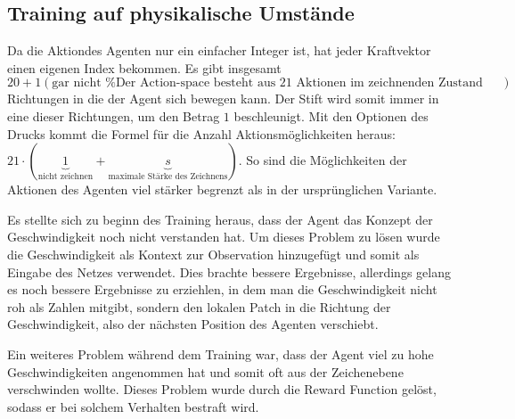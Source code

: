 \subsection*{Training auf physikalische Umstände}



Da die Aktiondes Agenten nur ein einfacher Integer ist, hat jeder Kraftvektor
einen eigenen Index bekommen. Es gibt insgesamt $20 + 1 (\text{gar nicht     %
bewegen})$ Richtungen in die der Agent sich bewegen kann. Der Stift wird somit %
immer in eine dieser Richtungen, um den Betrag $1$ beschleunigt. Mit den
Optionen des Drucks kommt die Formel für die Anzahl Aktionsmöglichkeiten heraus:
$21\cdot(\underbrace{1}_{\text{nicht zeichnen}} + \underbrace{s}_{\text{maximale
Stärke des Zeichnens}})$. So sind die Möglichkeiten der Aktionen des Agenten
viel stärker begrenzt als in der ursprünglichen Variante. %

Es stellte sich zu beginn des Training heraus, dass der Agent das Konzept der
Geschwindigkeit noch nicht verstanden hat. Um dieses Problem zu lösen wurde die %
Geschwindigkeit als Kontext zur Observation hinzugefügt und somit als Eingabe   %
des Netzes verwendet. Dies brachte bessere Ergebnisse, allerdings gelang es noch
bessere Ergebnisse zu erziehlen, in dem man die Geschwindigkeit nicht roh als
Zahlen mitgibt, sondern den lokalen Patch in die Richtung der Geschwindigkeit,
also der nächsten Position des Agenten verschiebt.

Ein weiteres Problem während dem Training war, dass der Agent viel zu hohe
Geschwindigkeiten angenommen hat und somit oft aus der Zeichenebene verschwinden
wollte. Dieses Problem wurde durch die Reward Function gelöst, sodass er bei
solchem Verhalten bestraft wird.

